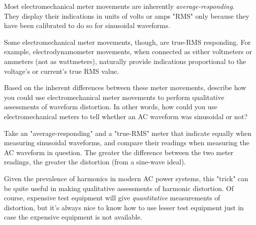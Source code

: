 

Most electromechanical meter movements are inherently {\it average-responding}.  They display their indications in units of volts or amps "RMS" only because they have been calibrated to do so for sinusoidal waveforms.

Some electromechanical meter movements, though, are true-RMS responding.  For example, electrodynamometer movements, when connected as either voltmeters or ammeters (not as wattmeters), naturally provide indications proportional to the voltage's or current's true RMS value.

Based on the inherent differences between these meter movements, describe how you could use electromechanical meter movements to perform qualitative assessments of waveform distortion.  In other words, how could you use electromechanical meters to tell whether an AC waveform was sinusoidal or not?







Take an "average-responding" and a "true-RMS" meter that indicate equally when measuring sinusoidal waveforms, and compare their readings when measuring the AC waveform in question.  The greater the difference between the two meter readings, the greater the distortion (from a sine-wave ideal).







Given the prevalence of harmonics in modern AC power systems, this "trick" can be quite useful in making qualitative assessments of harmonic distortion.  Of course, expensive test equipment will give {\it quantitative} measurements of distortion, but it's always nice to know how to use lesser test equipment just in case the expensive equipment is not available.



